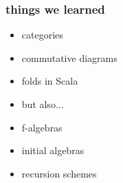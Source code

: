\documentclass[include/preamble.tex]{subfiles}
\begin{document}
{
  
}











\begin{frame}
  \frametitle{things we learned}
  \begin{itemize}
    \pause
  \item categories
  \item commutative diagrams
  \item folds in Scala
    \newline
    \pause
  \item[] but also...
    \newline
    \pause
  \item f-algebras
    \pause
  \item initial algebras
    \pause
  \item recursion schemes
  \end{itemize}
\end{frame}
\end{document}
